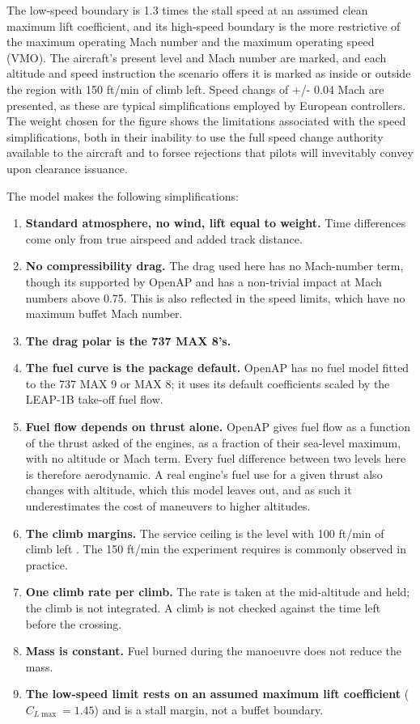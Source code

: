 The low-speed boundary is 1.3 times the stall speed at an assumed clean maximum lift coefficient, and its high-speed boundary is the more restrictive of the maximum operating Mach number and the maximum operating speed (VMO). The aircraft's present level and Mach number are marked, and each altitude and speed instruction the scenario offers it is marked as inside or outside the region with 150 ft/min of climb left. Speed changs of +/- 0.04 Mach are presented, as these are typical simplifications employed by European controllers. The weight chosen for the figure shows the limitations associated with the speed simplifications, both in their inability to use the full speed change authority available to the aircraft and to forsee rejections that pilots will invevitably convey upon clearance issuance. 

The model makes the following simplifications:
\begin{enumerate}
\item \textbf{Standard atmosphere, no wind, lift equal to weight.} Time differences come only from true airspeed and added track distance.
\item \textbf{No compressibility drag.} The drag used here has no Mach-number term, though its supported by OpenAP and has a non-trivial impact at Mach numbers above 0.75. This is also reflected in the speed limits, which have no maximum buffet Mach number.
\item \textbf{The drag polar is the 737 MAX 8's.}
\item \textbf{The fuel curve is the package default.} OpenAP has no fuel model fitted to the 737 MAX 9 or MAX 8; it uses its default coefficients scaled by the LEAP-1B take-off fuel flow.
\item \textbf{Fuel flow depends on thrust alone.} OpenAP gives fuel flow as a function of the thrust asked of the engines, as a fraction of their sea-level maximum, with no altitude or Mach term. Every fuel difference between two levels here is therefore aerodynamic. A real engine's fuel use for a given thrust also changes with altitude, which this model leaves out, and as such it underestimates the cost of maneuvers to higher altitudes.
\item \textbf{The climb margins.} The service ceiling is the level with 100 ft/min of climb left \cite{faa2015ac61107b}. The 150 ft/min the experiment requires is commonly observed in practice.
\item \textbf{One climb rate per climb.} The rate is taken at the mid-altitude and held; the climb is not integrated. A climb is not checked against the time left before the crossing.
\item \textbf{Mass is constant.} Fuel burned during the manoeuvre does not reduce the mass.
\item \textbf{The low-speed limit rests on an assumed maximum lift coefficient} ($C_{L\max} = 1.45$) and is a stall margin, not a buffet boundary.
\end{enumerate}

